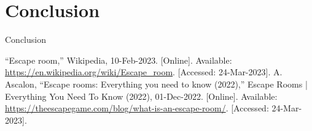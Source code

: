 \documentclass[conference]{IEEEtran}
\begin{document}
\section{Conclusion}
Conclusion

\begin{thebibliography}{00}

     “Escape room,” Wikipedia, 10-Feb-2023. [Online]. Available: \url{https://en.wikipedia.org/wiki/Escape_room}. [Accessed: 24-Mar-2023].
     A. Ascalon, “Escape rooms: Everything you need to know (2022),” Escape Rooms | Everything You Need To Know (2022), 01-Dec-2022. [Online]. Available:  \url{https://theescapegame.com/blog/what-is-an-escape-room/}. [Accessed: 24-Mar-2023].

\end{thebibliography}
\end{document}

